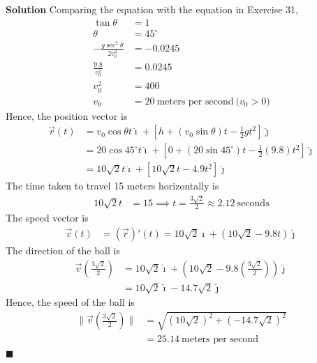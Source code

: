 \documentclass{report}
\begin{document}
\begin{enumerate}
          \textbf{Solution} Comparing the equation with the equation in Exercise 31,
          \begin{align*}
              \tan \theta                       & = 1                                                \\
              \theta                            & = 45^{\circ}                                       \\
              -\frac{g \sec ^2 \theta}{2 v_0^2} & = -0.0245                                          \\
              \frac{9.8}{v_0^2}                 & = 0.0245                                           \\
              v_0^2                             & = 400                                              \\
              v_0                               & = 20\ \text{meters per second}\ \text{($v_0 > 0$)}
          \end{align*}
          Hence, the position vector is
          \begin{align*}
              \vec{r}(t) & = v_0\cos\theta t\hat{\imath} + \left[h + (v_0\sin\theta) t - \frac{1}{2}gt^2\right]\hat{\jmath}               \\
                         & = 20\cos{45^{\circ}} t\hat{\imath} + \left[0 + (20\sin{45^{\circ}}) t - \frac{1}{2}(9.8)t^2\right]\hat{\jmath} \\
                         & = 10\sqrt{2} t\hat{\imath} + \left[10\sqrt{2} t - 4.9t^2\right]\hat{\jmath}
          \end{align*}
          The time taken to travel 15 meters horizontally is
          \begin{align*}
              10\sqrt{2} t & = 15 \implies t = \frac{3\sqrt{2}}{2} \approx 2.12\ \text{seconds}
          \end{align*}
          The speed vector is
          \begin{align*}
              \vec{v}(t) & = (\vec{r})'(t) = 10\sqrt{2}\hat{\imath} + (10\sqrt{2} - 9.8t)\hat{\jmath}
          \end{align*}
          The direction of the ball is
          \begin{align*}
              \vec{v}\left(\frac{3\sqrt{2}}{2}\right) & = 10\sqrt{2}\hat{\imath} + (10\sqrt{2} - 9.8\left(\frac{3\sqrt{2}}{2}\right))\hat{\jmath} \\
                                                      & = 10\sqrt{2}\hat{\imath} - 14.7\sqrt{2}\hat{\jmath}
          \end{align*}
          Hence, the speed of the ball is
          \begin{align*}
              \lVert\vec{v}\left(\frac{3\sqrt{2}}{2}\right)\rVert & = \sqrt{(10\sqrt{2})^2 + (-14.7\sqrt{2})^2} \\
                                                                  & = 25.14\ \text{meters per second}
          \end{align*} \hfill$\blacksquare$
\end{enumerate}
\end{document}
